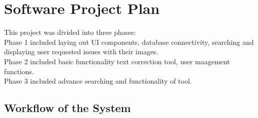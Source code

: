 \documentclass[amsart, 12pt]{article}
\begin{document}
\section{Software Project Plan}

This project was divided into three phases: \\
Phase 1 included laying out UI components, database connectivity, searching and displaying user requested issues with their images. \\
Phase 2 included basic functionality text correction tool, user maagement functions. \\
Phase 3 included advance searching and functionality of tool. \\

\subsection{Workflow of the System}
\end{document}
